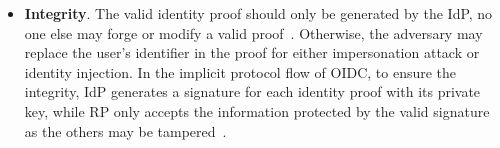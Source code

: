 \begin{itemize}
\item \textbf{Integrity}. The valid identity proof should only be generated by the IdP,
no one else may forge or modify a valid proof~\cite{WangZLG16}.
Otherwise, the adversary may replace the user's identifier in the proof for either impersonation attack or identity injection.
In the implicit protocol flow of OIDC, to ensure the integrity, IdP generates a signature for each identity proof with its private key, while RP  only accepts the information protected by the valid signature as the others may be tampered~\cite{WangCW12, SomorovskyMSKJ12}.
\end{itemize}




